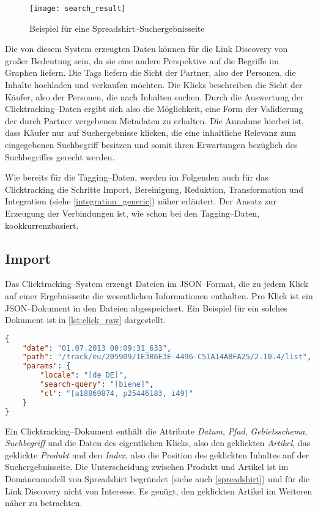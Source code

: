 \begin{figure}[t]
\centering
\texttt{[image: search\_result]}
\caption{Beispiel für eine Spreadshirt--Suchergebnisseite}
\label{fig:search_result}
\end{figure}

Die von diesem System erzeugten Daten können für die Link Discovery von großer Bedeutung sein, da sie eine andere Perspektive auf die Begriffe im Graphen liefern. Die Tags liefern die Sicht der Partner, also der Personen, die Inhalte hochladen und verkaufen möchten. Die Klicks beschreiben die Sicht der Käufer, also der Personen, die nach Inhalten suchen. Durch die Auswertung der Clicktracking--Daten ergibt sich also die Möglichkeit, eine Form der Validierung der durch Partner vergebenen Metadaten zu erhalten. Die Annahme hierbei ist, dass Käufer nur auf Suchergebnisse klicken, die eine inhaltliche Relevanz zum eingegebenen Suchbegriff besitzen und somit ihren Erwartungen bezüglich des Suchbegriffes gerecht werden.

Wie bereits für die Tagging--Daten, werden im Folgenden auch für das Clicktracking die Schritte Import, Bereinigung, Reduktion, Transformation und Integration (siehe \cref{integration_generic}) näher erläutert. Der Ansatz zur Erzeugung der Verbindungen ist, wie schon bei den Tagging--Daten, kookkurrenzbasiert.

\subsection{Import}
\label{click_import}

Das Clicktracking--System erzeugt Dateien im JSON--Format, die zu jedem Klick auf einer Ergebnisseite die wesentlichen Informationen enthalten. Pro Klick ist ein JSON--Dokument in den Dateien abgespeichert. Ein Beispiel für ein solches Dokument ist in \cref{lst:click_raw} dargestellt.

\begin{lstlisting}[language=json, label={lst:click_raw}, caption={JSON--Beispiel für ein Clicktracking--Rohdokument}, float]
{
    "date": "01.07.2013 00:09:31_633",
    "path": "/track/eu/205909/1E3B6E3E-4496-C51A14A8FA25/2.10.4/list",
    "params": {
        "locale": "[de_DE]",
        "search-query": "[biene]",
        "cl": "[a18869874, p25446183, i49]"
    }
}
\end{lstlisting}

Ein Clicktracking--Dokument enthält die Attribute \emph{Datum}, \emph{Pfad}, \emph{Gebietsschema}, \emph{Suchbegriff} und die Daten des eigentlichen Klicks, also den geklickten \emph{Artikel}, das geklickte \emph{Produkt} und den \emph{Index}, also die Position des geklickten Inhaltes auf der Suchergebnisseite. Die Unterscheidung zwischen Produkt und Artikel ist im Domänenmodell von Spreadshirt begründet (siehe auch \cref{spreadshirt}) und für die Link Discovery nicht von Interesse. Es genügt, den geklickten Artikel im Weiteren näher zu betrachten.

